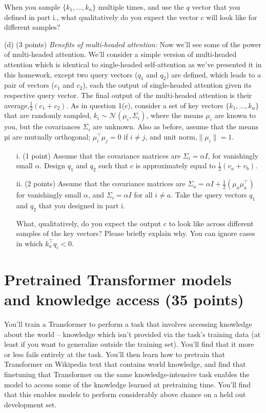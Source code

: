 \documentclass[letterpaper,12pt]{article}
\begin{document}
\begin{itemize}
	When you sample $\{k_1, \ldots , k_n\}$ multiple times, and use the $q$ vector that you defined in part i., what qualitatively do you expect the vector $c$ will look like for different samples?

	\end{itemize}	
	
	\noindent (d) (3 points) \textit{Benefits of multi-headed attention:} Now we'll see some of the power of multi-headed attention. We'll consider a simple version of multi-headed attention which is identical to single-headed self-attention as we've presented it in this homework, except two query vectors ($q_1$ and $q_2$) are defined, which leads to a pair of vectors ($c_1$ and $c_2$), each the output of single-headed attention given its respective query vector. The final output of the multi-headed attention is their average,$\frac{1}{2}(c_1+c_2)$. As in question 1(c), consider a set of key vectors $\{k_1, \ldots , k_n\}$ that are randomly sampled, $k_i \sim \mathcal{N} (\mu_i, \Sigma_i)$, where the means $\mu_i$ are known to you, but the covariances $\Sigma_i$ are unknown. Also as before,	assume that the means µi are mutually orthogonal; $\mu^\top_i \mu_j = 0$ if $i \neq j$, and unit norm,$\|\mu_i\|= 1$.
	
	\begin{itemize}
	\item[i.] 
	(1 point) Assume that the covariance matrices are $\Sigma_i = \alpha I$, for vanishingly small $\alpha$. Design $q_1$
	and $q_2$ such that $c$ is approximately equal to $\frac{1}{2}(v_a + v_b)$.
	
	\item[ii.] 
	(2 points) Assume that the covariance matrices are $\Sigma_a = \alpha I + \frac{1}{2}(\mu_a \mu_a^\top)$ for vanishingly small $\alpha$, and $\Sigma_i = \alpha I$ for all $i \neq a$. Take the query vectors $q_1$ and $q_2$ that you designed in part i.
	
	What, qualitatively, do you expect the output $c$ to look like across different samples of the key
	vectors? Please briefly explain why. You can ignore cases in which $k^\top_a q_i < 0$.
	\end{itemize}	
	
	\section{Pretrained Transformer models and knowledge access (35 points)}
	
	\noindent You'll train a Transformer to perform a task that involves accessing knowledge about the world – knowledge which isn't provided via the task's training data (at least if you want to generalize outside the training set). You'll find that it more or less fails entirely at the task. You'll then learn how to pretrain that Transformer on Wikipedia text that contains world knowledge, and find that finetuning that Transformer on the same knowledge-intensive task enables the model to access some of the knowledge learned at pretraining time. You'll find that this enables models to perform considerably above chance on a held out development set.
	
\end{document}

